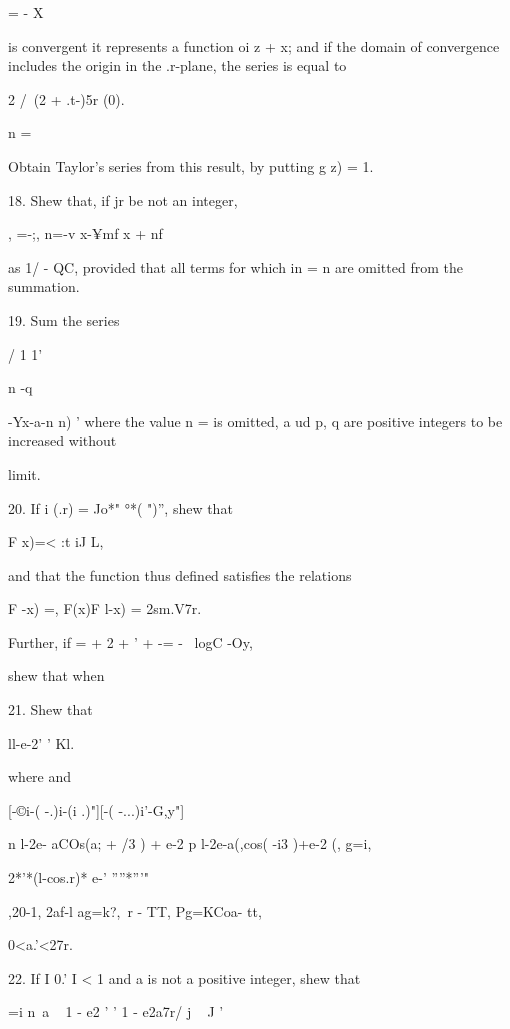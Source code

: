 {  = - X

is convergent it represents a function oi z + x; and if the domain of
convergence includes the origin in the .r-plane, the series is equal
to


2 /\ (2 + .t-)5r (0).

n =

Obtain Taylor's series from this result, by putting g z) = 1.

18. Shew that, if jr be not an integer,

, =-;, n=-v x-¥mf x + nf

as 1/ - QC, provided that all terms for which in = n are omitted from
the summation.


19. Sum the series

  / 1 1'

n -q \ \ {-Yx-a-n n) ' where the value n = is omitted, a ud p, q are
positive integers to be increased without

limit.


20. If i (.r) = Jo*" °*( ")'', shew that

F x)=< :t iJ L,

and that the function thus defined satisfies the relations

F -x) =, F(x)F l-x) = 2sm.V7r.

Further, if = + 2 + ' + -= - \ logC -Oy,

shew that when

21. Shew that

ll-e-2' ' Kl.


where and

[-©i-( -.)i-(i .)"][-( -...)i'-G,y"]

n l-2e- aCOs(a; + /3 ) + e-2 p l-2e-a(,cos( -i3 )+e-2 (, g=i,

2*'*(l-cos.r)* e-' ''''*'''"

,20-1, 2af-l ag=k?,\ r - TT, Pg=KCoa- tt,

0<a.'<27r.


%
%

22. If I 0.' I < 1 and a is not a positive integer, shew that

 =i n~a ~ 1 - e2 ' ' 1 - e2a7r/ j ~ J '

}}
